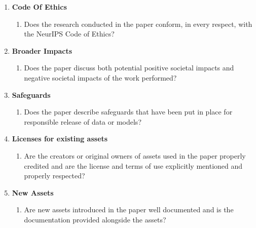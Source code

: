 \documentclass{article}
\begin{document}
\begin{enumerate}
\item {\bf Code Of Ethics}
    \begin{enumerate}
        \item Does the research conducted in the paper conform, in every respect, with the NeurIPS Code of Ethics?
        \answerYes{}
    \end{enumerate}

\item {\bf Broader Impacts}
    \begin{enumerate}
        \item Does the paper discuss both potential positive societal impacts and negative societal impacts of the work performed?
    \end{enumerate}

\item {\bf Safeguards}
    \begin{enumerate}
        \item Does the paper describe safeguards that have been put in place for responsible release of data or models?
    \end{enumerate}

\item {\bf Licenses for existing assets}
    \begin{enumerate}
        \item Are the creators or original owners of assets used in the paper properly credited and are the license and terms of use explicitly mentioned and properly respected?
    \end{enumerate}

\item {\bf New Assets}
    \begin{enumerate}
        \item Are new assets introduced in the paper well documented and is the documentation provided alongside the assets?
    \end{enumerate}


\end{enumerate}
\end{document}

